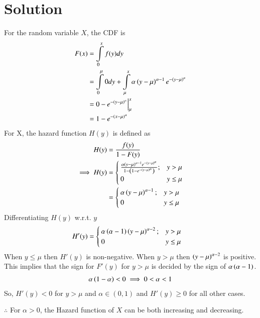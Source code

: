 \documentclass[journal,12pt,twocolumn]{IEEEtran}
\begin{document}
\section*{Solution}
\newcommand{\Integral}[2]{\ensuremath{\int\limits_{#1}^{#2}}}
For the random variable $X$, the CDF is
\begin{align}
    F(x)&=\Integral{0}{x}f(y)dy\\
        &=\Integral{0}{\mu}0 dy +\Integral{\mu}{x}\alpha\brak{y-\mu}^{\alpha -1}e^{-\brak{y-\mu}^\alpha}\\
        &=0 -e^{-\brak{y-\mu}^\alpha}\Big|_{\mu}^{x}\\
        &=1-e^{-\brak{x-\mu}^{\alpha}}
\end{align}
For X, the hazard function $H(y)$ is defined as
\begin{align}
    H(y)&=\frac{f(y)}{1-F(y)}\nonumber\\
    \implies H(y)&=\begin{cases}\frac{\alpha\left(y-\mu\right)^{\alpha -1}e^{-\left(y-\mu\right)^\alpha}}{1-\left(1-e^{-\left(y-\mu\right)^{\alpha}}\right)};&y>\mu\\
                        0                               &y\leq\mu   
    \end{cases}\nonumber\\
    &=\begin{cases}\alpha\left(y-\mu\right)^{\alpha -1};&y>\mu\\
                        0                            &y\leq\mu   
    \end{cases}\nonumber
\end{align}
Differentiating $H(y)$ w.r.t. $y$
\begin{align}
    H'(y)&=\begin{cases}\alpha\left(\alpha - 1\right)\left(y-\mu\right)^{\alpha -2};&y>\mu\\
                        0                            &y\leq\mu   
    \end{cases}\nonumber
\end{align}
When $y\leq \mu$ then $H'(y)$ is non-negative. When $y>\mu$ then $\left(y-\mu\right)^{\alpha -2}$ is positive. This implies that the sign for $F'(y)$ for $y>\mu$ is decided by the sign of $\alpha\left(\alpha -1\right)$.
\begin{align}
    \alpha\left(1-\alpha\right)<0
    \implies 0<\alpha<1
\end{align}
So, $H'(y)<0$ for $y>\mu$ and $\alpha \in (0,1)$ and $H'(y) \geq 0$ for all other cases.

$\therefore$ For $\alpha>0$, the Hazard function of $X$ can be both increasing and decreasing.
\end{document}
